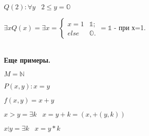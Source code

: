 \documentclass{article}
\begin{document}
$Q(2):\forall y \hspace{10pt} 2\leqslant y= \mathds{O}$

$\exists x Q(x) = \exists x = \left\{ \begin{array}{ll}
         x = 1 & \mbox{$\mathds{1}$};\\
         else  & \mbox{$\mathds{O}$}.\end{array} \right. = \mathds{1}$ - при х=1.
         
~\\
\textbf{Еще примеры.}

$M = \mathds{N}$

$P(x,y): x=y$

$f(x,y)=x+y$

$x>y=\exists k \hspace{10pt} x=y+k = (x,+(y,k))$

$x\vdots y = \exists k \hspace{10pt} x=y*k$
\end{document}
